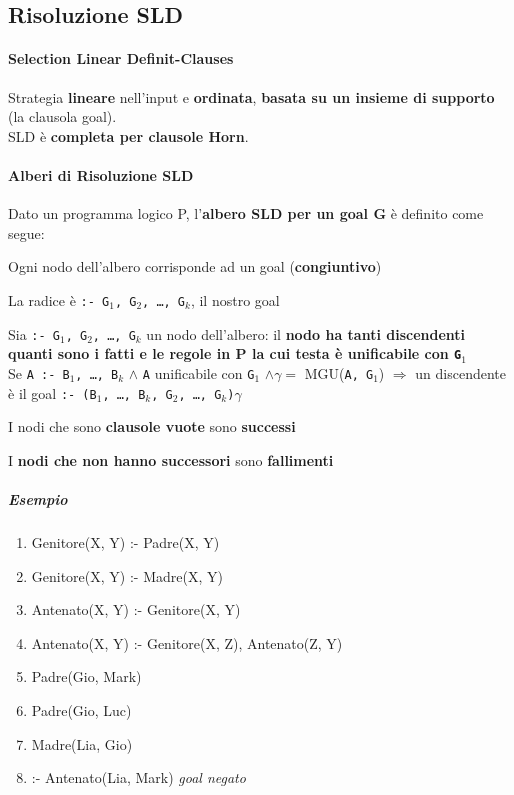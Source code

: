 \documentclass[10pt]{book}
\begin{document}
\subsection{Risoluzione SLD}
\paragraph{Selection Linear Definit-Clauses} Strategia \textbf{lineare} nell'input e  \textbf{ordinata}, \textbf{basata su un insieme di supporto} (la clausola goal).\\SLD è \textbf{completa per clausole Horn}.
\paragraph{Alberi di Risoluzione SLD} Dato un programma logico P, l'\textbf{albero SLD per un goal G} è definito come segue:
\begin{list}{}{}
	\item Ogni nodo dell'albero corrisponde ad un goal (\textbf{congiuntivo})
	\item La radice è \texttt{:- G$_1$, G$_2$, \ldots, G$_k$}, il nostro goal
	\item Sia \texttt{:- G$_1$, G$_2$, \ldots, G$_k$} un nodo dell'albero: il \textbf{nodo ha tanti discendenti quanti sono i fatti e le regole in P la cui testa è unificabile con \texttt{G$_1$}}\\
	Se \texttt{A :- B$_1$, \ldots, B$_k$} $\wedge$ \texttt{A} unificabile con \texttt{G$_1$} $\wedge \gamma =$ MGU(\texttt{A, G$_1$}) $\Rightarrow$ un discendente\\
	è il goal \texttt{:- (B$_1$, \ldots, B$_k$, G$_2$, \ldots, G$_k$)$\gamma$}
	\item I nodi che sono \textbf{clausole vuote} sono \textbf{successi}
	\item I \textbf{nodi che non hanno successori} sono \textbf{fallimenti}
\end{list}
\subparagraph{Esempio}
\begin{enumerate}
	\item Genitore(X, Y) :- Padre(X, Y)
	\item Genitore(X, Y) :- Madre(X, Y)
	\item Antenato(X, Y) :- Genitore(X, Y)
	\item Antenato(X, Y) :- Genitore(X, Z), Antenato(Z, Y)
	\item Padre(Gio, Mark)
	\item Padre(Gio, Luc)
	\item Madre(Lia, Gio)\\
	\item :- Antenato(Lia, Mark) \textit{goal negato}
\end{enumerate}
\end{document}
